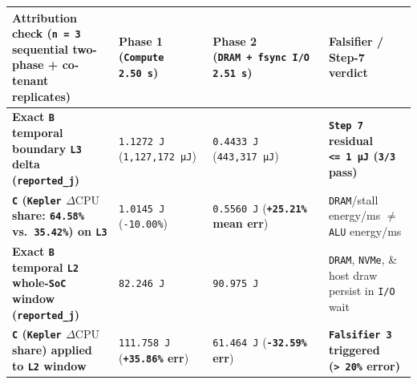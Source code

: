 \documentclass[10pt,letterpaper]{article}
\begin{document}
{\footnotesize\setlength{\tabcolsep}{3.8pt}\renewcommand{\arraystretch}{1.15}
\begin{longtable}[]{@{}
  >{\raggedright\arraybackslash}p{}
  >{\raggedleft\arraybackslash}p{}
  >{\raggedleft\arraybackslash}p{}
  >{\raggedright\arraybackslash}p{}@{}}
\toprule\noalign{}
\begin{minipage}[b]{\linewidth}\raggedright
\textbf{Attribution check (\texttt{n\ =\ 3} sequential two-phase +
co-tenant replicates)}
\end{minipage} & \begin{minipage}[b]{\linewidth}\raggedleft
\textbf{Phase 1 (\texttt{Compute} \texttt{2.50\ s})}
\end{minipage} & \begin{minipage}[b]{\linewidth}\raggedleft
\textbf{Phase 2 (\texttt{DRAM\ +\ fsync\ I/\allowbreak{}O} \texttt{2.51\ s})}
\end{minipage} & \begin{minipage}[b]{\linewidth}\raggedright
\textbf{Falsifier / Step-7 verdict}
\end{minipage} \\
\midrule\noalign{}
\endhead
\bottomrule\noalign{}
\endlastfoot
\textbf{Exact \texttt{B} temporal boundary \texttt{L3} delta
(\texttt{reported\_\allowbreak{}j})} & \texttt{1.1272\ J} (\texttt{1,\allowbreak{}127,\allowbreak{}172\ µJ}) &
\texttt{0.4433\ J} (\texttt{443,\allowbreak{}317\ µJ}) & \textbf{\texttt{Step\ 7}
residual \texttt{\textless{}=\ 1\ µJ} (\texttt{3/3} pass)} \\
\textbf{\texttt{C} (\texttt{Kepler} \(\Delta\text{CPU}\) share:
\texttt{64.58\%} vs.~\texttt{35.42\%}) on \texttt{L3}} &
\texttt{1.0145\ J} (\texttt{-10.00\%}) & \texttt{0.5560\ J}
(\textbf{\texttt{+25.21\%} mean err}) & \texttt{DRAM}/\allowbreak{}stall energy/ms
\(\ne\) \texttt{ALU} energy/ms \\
\textbf{Exact \texttt{B} temporal \texttt{L2} whole-\texttt{SoC} window
(\texttt{reported\_\allowbreak{}j})} & \texttt{82.246\ J} & \texttt{90.975\ J} &
\texttt{DRAM}, \texttt{NVMe}, \& host draw persist in \texttt{I/O}
wait \\
\textbf{\texttt{C} (\texttt{Kepler} \(\Delta\text{CPU}\) share) applied
to \texttt{L2} window} & \texttt{111.\allowbreak{}758\ J} (\textbf{\texttt{+35.86\%}
err}) & \texttt{61.464\ J} (\textbf{\texttt{-32.59\%} err}) &
\textbf{\texttt{Falsifier\ 3} triggered (\texttt{\textgreater{}\ 20\%}
error)} \\
\end{longtable}
}
\end{document}
